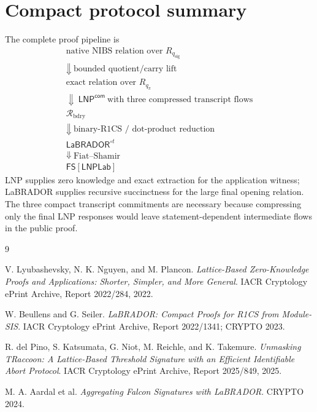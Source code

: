 \documentclass[11pt,a4paper]{article}
\newcommand{\LNPcom}{\mathsf{LNP}^{\mathsf{com}}}
\newcommand{\LaB}{\mathsf{LaBRADOR}}
\newcommand{\LNPLab}{\mathsf{LNPLab}}
\newcommand{\FS}{\mathsf{FS}}
\newcommand{\calR}{\mathcal{R}}
\begin{document}
\section{Compact protocol summary}

The complete proof pipeline is
\[
 \boxed{
 \begin{array}{c}
 \text{native NIBS relation over }R_{q_{\mathrm{sig}}}
 \\ \Downarrow\ \text{bounded quotient/carry lift}
 \\ \text{exact relation over }R_{q_\pi}
 \\ \Downarrow\ \LNPcom\ \text{with three compressed transcript flows}
 \\ \calR_{\mathrm{bdry}}
 \\ \Downarrow\ \text{binary-R1CS / dot-product reduction}
 \\ \LaB^{\circ t}
 \\ \Downarrow\ \text{Fiat--Shamir}
 \\ \FS[\LNPLab]
 \end{array}}
\]
LNP supplies zero knowledge and exact extraction for the application witness;
LaBRADOR supplies recursive succinctness for the large final opening relation.
The three compact transcript commitments are necessary because compressing only
the final LNP responses would leave statement-dependent intermediate flows in
the public proof.

\begin{thebibliography}{9}

V. Lyubashevsky, N. K. Nguyen, and M. Plancon.
\newblock \emph{Lattice-Based Zero-Knowledge Proofs and Applications: Shorter,
Simpler, and More General}.
\newblock IACR Cryptology ePrint Archive, Report 2022/284, 2022.

W. Beullens and G. Seiler.
\newblock \emph{LaBRADOR: Compact Proofs for R1CS from Module-SIS}.
\newblock IACR Cryptology ePrint Archive, Report 2022/1341; CRYPTO 2023.

R. del Pino, S. Katsumata, G. Niot, M. Reichle, and K. Takemure.
\newblock \emph{Unmasking TRaccoon: A Lattice-Based Threshold Signature with an
Efficient Identifiable Abort Protocol}.
\newblock IACR Cryptology ePrint Archive, Report 2025/849, 2025.

M. A. Aardal et al.
\newblock \emph{Aggregating Falcon Signatures with LaBRADOR}.
\newblock CRYPTO 2024.

\end{thebibliography}
\end{document}
